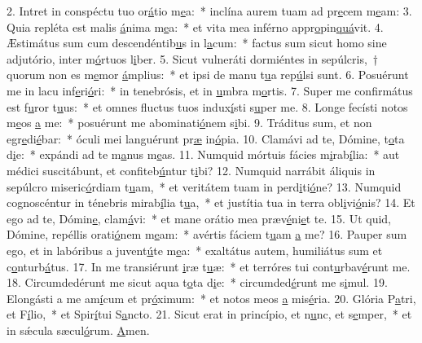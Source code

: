 2. Intret in conspéctu tuo or\uline{á}tio m\uline{e}a:~* inclína aurem tuam ad pr\uline{e}cem m\uline{e}am:
3. Quia repléta est malis \uline{á}nima m\uline{e}a:~* et vita mea inférno appr\uline{o}pin\uline{quá}vit.
4. Æstimátus sum cum descendéntib\uline{u}s in l\uline{a}cum:~* factus sum sicut homo sine adjutório, inter m\uline{ó}rtuos l\uline{i}ber.
5. Sicut vulneráti dormiéntes in sepúlcris,~† quorum non es m\uline{e}mor \uline{á}mplius:~* et ipsi de manu t\uline{u}a rep\uline{ú}lsi sunt.
6. Posuérunt me in lacu inf\uline{e}ri\uline{ó}ri:~* in tenebrósis, et in \uline{u}mbra m\uline{o}rtis.
7. Super me confirmátus est f\uline{u}ror t\uline{u}us:~* et omnes fluctus tuos indux\uline{í}sti s\uline{u}per me.
8. Longe fecísti notos m\uline{e}os \uline{a} me:~* posuérunt me abominati\uline{ó}nem s\uline{i}bi.
9. Tráditus sum, et non egr\uline{e}di\uline{é}bar:~* óculi mei languérunt pr\uline{æ} in\uline{ó}pia.
10. Clamávi ad te, Dómine, t\uline{o}ta d\uline{i}e:~* expándi ad te m\uline{a}nus m\uline{e}as.
11. Numquid mórtuis fácies m\uline{i}rab\uline{í}lia:~* aut médici suscitábunt, et confiteb\uline{ú}ntur t\uline{i}bi?
12. Numquid narrábit áliquis in sepúlcro miseric\uline{ó}rdiam t\uline{u}am,~* et veritátem tuam in perd\uline{i}ti\uline{ó}ne?
13. Numquid cognoscéntur in ténebris mirab\uline{í}lia t\uline{u}a,~* et justítia tua in terra obl\uline{i}vi\uline{ó}nis?
14. Et ego ad te, Dómin\uline{e}, clam\uline{á}vi:~* et mane orátio mea præv\uline{é}ni\uline{e}t te.
15. Ut quid, Dómine, repéllis orati\uline{ó}nem m\uline{e}am:~* avértis fáciem t\uline{u}am \uline{a} me?
16. Pauper sum ego, et in labóribus a juvent\uline{ú}te m\uline{e}a:~* exaltátus autem, humiliátus sum et c\uline{o}nturb\uline{á}tus.
17. In me transiérunt \uline{i}ræ t\uline{u}æ:~* et terróres tui cont\uline{u}rbav\uline{é}runt me.
18. Circumdedérunt me sicut aqua t\uline{o}ta d\uline{i}e:~* circumded\uline{é}runt me s\uline{i}mul.
19. Elongásti a me am\uline{í}cum et pr\uline{ó}ximum:~* et notos meos \uline{a} mis\uline{é}ria.
20. Glória P\uline{a}tri, et F\uline{í}lio,~* et Spir\uline{í}tui S\uline{a}ncto.
21. Sicut erat in princípio, et n\uline{u}nc, et s\uline{e}mper,~* et in sǽcula sæcul\uline{ó}rum. \uline{A}men.
